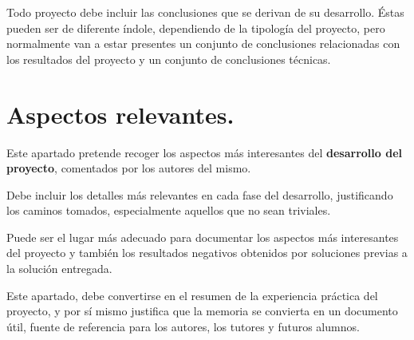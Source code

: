 
Todo proyecto debe incluir las conclusiones que se derivan de su desarrollo. Éstas pueden ser de diferente índole, dependiendo de la tipología del proyecto, pero normalmente van a estar presentes un conjunto de conclusiones relacionadas con los resultados del proyecto y un conjunto de conclusiones técnicas. 



\section{Aspectos relevantes.}

Este apartado pretende recoger los aspectos más interesantes del \textbf{desarrollo del proyecto}, comentados por los autores del mismo.

Debe incluir los detalles más relevantes en cada fase del desarrollo, justificando los caminos tomados, especialmente aquellos que no sean triviales. 

Puede ser el lugar más adecuado para documentar los aspectos más interesantes del proyecto y también los resultados negativos obtenidos por soluciones previas a la solución entregada.

Este apartado, debe convertirse en el resumen de la experiencia práctica del proyecto, y por sí mismo justifica que la memoria se convierta en un documento útil, fuente de referencia para los autores, los tutores y futuros alumnos.
